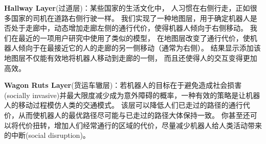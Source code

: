 \textbf{\color{blue}Hallway Layer}(过道层)：某些国家的生活文化中，
人习惯在右侧行走，正如很多国家的司机在道路右侧行驶一样。
我们实现了一种地图层，用于确定机器人是否处于走廊中，动态增加走廊左侧的通行代价，使得机器人倾向于右侧移动。 
我们在最近的一项用户研究中使用了类似的模型\cite{lu2013towards}，
在地图层改变了通行代价，使机器人倾向于在最接近它的人的走廊的另一侧移动（通常为右侧）。 
结果显示添加该地图层不仅能有效地将机器人移动到走廊的一侧，
而且还使得人的交互变得更加高效。

\textbf{\color{blue}Wagon Ruts Layer}(货运车辙层)：若机器人的目标在于避免造成社会损害(socially invasive)并最大限度减少成为意外障碍的概率，一种有效的策略是让机器人的移动过程模仿人类的交通模式。 
该层可以降低人们已走过的路径的通行代价，从而使机器人的最优路径尽可能与已走过的路径大体保持一致。 
你甚至还可以将代价扭转，增加人们经常通行的区域的代价，尽量减少机器人给人类活动带来的中断(social disruption)。


